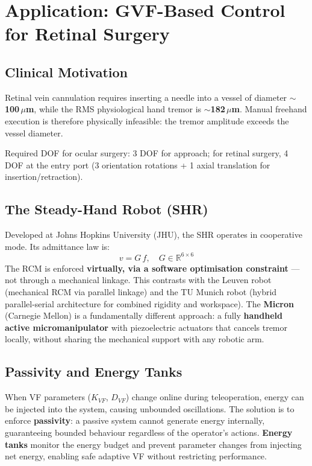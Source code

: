 \documentclass[11pt,a4paper,twoside]{report}
\begin{document}
\section{Application: GVF-Based Control for Retinal Surgery}
\subsection{Clinical Motivation}
Retinal vein cannulation requires inserting a needle into a vessel of diameter $\sim$\textbf{100\,$\mu$m}, while the RMS physiological hand tremor is $\sim$\textbf{182\,$\mu$m}. Manual freehand execution is therefore physically infeasible: the tremor amplitude exceeds the vessel diameter.

Required DOF for ocular surgery: 3 DOF for approach; for retinal surgery, 4 DOF at the entry port (3 orientation rotations + 1 axial translation for insertion/retraction).

\subsection{The Steady-Hand Robot (SHR)}
Developed at Johns Hopkins University (JHU), the SHR operates in cooperative mode. Its admittance law is:
\begin{equation}
    v = G\,f, \quad G \in \mathbb{R}^{6\times 6}
\end{equation}
The RCM is enforced \textbf{virtually, via a software optimisation constraint} — not through a mechanical linkage. This contrasts with the Leuven robot (mechanical RCM via parallel linkage) and the TU Munich robot (hybrid parallel-serial architecture for combined rigidity and workspace). The \textbf{Micron} (Carnegie Mellon) is a fundamentally different approach: a fully \textbf{handheld active micromanipulator} with piezoelectric actuators that cancels tremor locally, without sharing the mechanical support with any robotic arm.

\subsection{Passivity and Energy Tanks}
When VF parameters ($K_{VF}$, $D_{VF}$) change online during teleoperation, energy can be injected into the system, causing unbounded oscillations. The solution is to enforce \textbf{passivity}: a passive system cannot generate energy internally, guaranteeing bounded behaviour regardless of the operator's actions. \textbf{Energy tanks} monitor the energy budget and prevent parameter changes from injecting net energy, enabling safe adaptive VF without restricting performance.
\end{document}
